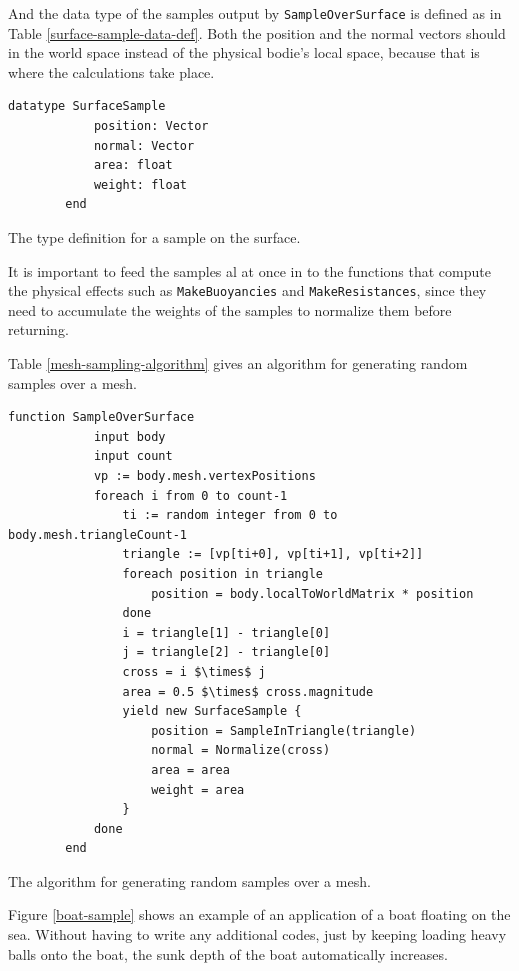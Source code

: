 And the data type of the samples output by \texttt{SampleOverSurface} is defined as in Table \ref{surface-sample-data-def}.
Both the position and the normal vectors should in the world space instead of the physical bodie's local space, because that is where the calculations take place.

\begin{table}[htb]
	\centering
	\begin{lstlisting}[style=pseudo]
		datatype SurfaceSample
			position: Vector
			normal: Vector
			area: float
			weight: float
		end
	\end{lstlisting}
	\caption{The type definition for a sample on the surface.}
	\label{surface-sample-data-def}
\end{table}

It is important to feed the samples al at once in to the functions that compute the physical effects such as \texttt{MakeBuoyancies} and \texttt{MakeResistances}, since they need to accumulate the weights of the samples to normalize them before returning.

Table \ref{mesh-sampling-algorithm} gives an algorithm for generating random samples over a mesh.

\begin{table}[htb]
	\centering
	\begin{lstlisting}[style=pseudo]
		function SampleOverSurface
			input body
			input count
			vp := body.mesh.vertexPositions
			foreach i from 0 to count-1
				ti := random integer from 0 to body.mesh.triangleCount-1
				triangle := [vp[ti+0], vp[ti+1], vp[ti+2]]
				foreach position in triangle
					position = body.localToWorldMatrix * position
				done
				i = triangle[1] - triangle[0]
				j = triangle[2] - triangle[0]
				cross = i $\times$ j
				area = 0.5 $\times$ cross.magnitude
				yield new SurfaceSample {
					position = SampleInTriangle(triangle)
					normal = Normalize(cross)
					area = area
					weight = area
				}
			done
		end
	\end{lstlisting}
	\caption{The algorithm for generating random samples over a mesh.}
	\label{mesh-sampling-algorithm}
\end{table}

Figure \ref{boat-sample} shows an example of an application of a boat floating on the sea.
Without having to write any additional codes, just by keeping loading heavy balls onto the boat, the sunk depth of the boat automatically increases.

